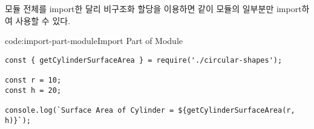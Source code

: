 모듈 전체를 import한  달리 비구조화 할당을 이용하면 \과 같이 모듈의 일부분만 import하여 사용할 수 있다.

\begin{codeenv}{code:import-part-module}{Import Part of Module}\begin{verbatim}
const { getCylinderSurfaceArea } = require('./circular-shapes');

const r = 10;
const h = 20;

console.log(`Surface Area of Cylinder = ${getCylinderSurfaceArea(r, h)}`);
\end{verbatim}
\end{codeenv}
